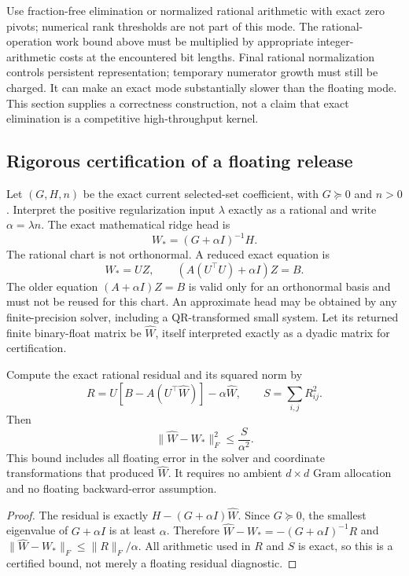 Use fraction-free elimination or normalized rational arithmetic with exact
zero pivots; numerical rank thresholds are not part of this mode. The
rational-operation work bound above must be multiplied by appropriate
integer-arithmetic costs at the encountered bit lengths. Final rational
normalization controls persistent representation; temporary numerator growth
must still be charged. It can make an exact mode substantially slower than
the floating mode. This section supplies a correctness construction, not a
claim that exact elimination is a competitive high-throughput kernel.

\subsection{Rigorous certification of a floating release}
Let $(G,H,n)$ be the exact current selected-set coefficient, with
$G\succeq0$ and $n>0$. Interpret the positive regularization input
$\lambda$ exactly as a rational and write $\alpha=\lambda n$. The exact
mathematical ridge head is
\[
 W_*=(G+\alpha I)^{-1}H.
\]
The rational chart is not orthonormal. A reduced exact equation is
\[
 W_*=UZ,\qquad (A(U^\top U)+\alpha I)Z=B.
\]
The older equation $(A+\alpha I)Z=B$ is valid only for an orthonormal basis
and must not be reused for this chart. An approximate head may be obtained
by any finite-precision solver, including a QR-transformed small system.
Let its returned finite binary-float matrix be $\widehat W$, itself
interpreted exactly as a dyadic matrix for certification.

\begin{theorem}
Compute the exact rational residual and its squared norm by
\[
 R=U\left[B-A(U^\top\widehat W)\right]-\alpha\widehat W,
 \qquad S=\sum_{i,j}R_{ij}^2.
\]
Then
\[
 \|\widehat W-W_*\|_F^2\le \frac{S}{\alpha^2}.
\]
This bound includes all floating error in the solver and coordinate
transformations that produced $\widehat W$. It requires no ambient
$d\times d$ Gram allocation and no floating backward-error assumption.
\end{theorem}
\begin{proof}
The residual is exactly $H-(G+\alpha I)\widehat W$. Since
$G\succeq0$, the smallest eigenvalue of $G+\alpha I$ is at least
$\alpha$. Therefore
$\widehat W-W_*=-(G+\alpha I)^{-1}R$ and
$\|\widehat W-W_*\|_F\le\|R\|_F/\alpha$.
All arithmetic used in $R$ and $S$ is exact, so this is a certified bound,
not merely a floating residual diagnostic.
\end{proof}

